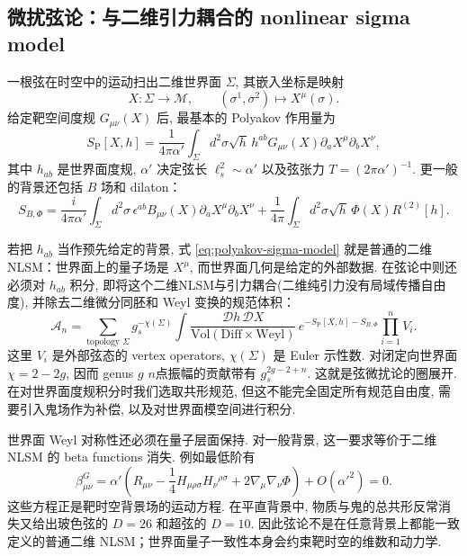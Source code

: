 \documentclass[10pt]{article}
\newcounter{ex}[section]\setcounter{ex}{0}
\numberwithin{equation}{section}
\begin{document}
\subsection{微扰弦论：与二维引力耦合的 nonlinear sigma model}

一根弦在时空中的运动扫出二维世界面 $\Sigma$, 其嵌入坐标是映射
\begin{equation}
X:\Sigma\longrightarrow\mathcal M,
\qquad
(\sigma^1,\sigma^2)\longmapsto X^\mu(\sigma).
\end{equation}
给定靶空间度规 $G_{\mu\nu}(X)$ 后, 最基本的 Polyakov 作用量为
\begin{equation}
S_{\mathrm P}[X,h]
=\frac{1}{4\pi\alpha'}
\int_\Sigma d^2\sigma\sqrt{h}\,
h^{ab}G_{\mu\nu}(X)
\partial_aX^\mu\partial_bX^\nu,
\label{eq:polyakov-sigma-model}
\end{equation}
其中 $h_{ab}$ 是世界面度规, $\alpha'$ 决定弦长 $\ell_s^2\sim\alpha'$ 以及弦张力 $T=(2\pi\alpha')^{-1}$. 更一般的背景还包括 $B$ 场和 dilaton：
\begin{equation}
S_{B,\Phi}
=\frac{i}{4\pi\alpha'}\int_\Sigma
d^2\sigma\,\epsilon^{ab}B_{\mu\nu}(X)
\partial_aX^\mu\partial_bX^\nu
+\frac{1}{4\pi}\int_\Sigma d^2\sigma\sqrt h\,
\Phi(X)R^{(2)}[h].
\end{equation}

若把 $h_{ab}$ 当作预先给定的背景, 式 \eqref{eq:polyakov-sigma-model} 就是普通的二维 NLSM：世界面上的量子场是 $X^\mu$, 而世界面几何是给定的外部数据. 在弦论中则还必须对 $h_{ab}$ 积分, 即将这个二维NLSM与引力耦合(二维纯引力没有局域传播自由度), 并除去二维微分同胚和 Weyl 变换的规范体积：
\begin{equation}
\mathcal A_n
=\sum_{\text{topology }\Sigma}
g_s^{-\chi(\Sigma)}
\int
\frac{\mathcal D h\,\mathcal D X}
{\mathrm{Vol}(\mathrm{Diff}\times\mathrm{Weyl})}
\,e^{-S_{\mathrm P}[X,h]-S_{B,\Phi}}
\prod_{i=1}^n V_i.
\label{eq:string-worldsheet-path-integral}
\end{equation}
这里 $V_i$ 是外部弦态的 vertex operators, $\chi(\Sigma)$ 是 Euler 示性数. 对闭定向世界面 $\chi=2-2g$, 因而 genus $g$ $n$点振幅的贡献带有 $g_s^{2g-2+n}$. 这就是弦微扰论的圈展开. 在对世界面度规积分时我们选取共形规范, 但这不能完全固定所有规范自由度, 需要引入鬼场作为补偿, 以及对世界面模空间进行积分. 

世界面 Weyl 对称性还必须在量子层面保持. 对一般背景, 这一要求等价于二维 NLSM 的 beta functions 消失. 例如最低阶有
\begin{equation}
\beta^G_{\mu\nu}
=\alpha'\left(
R_{\mu\nu}-\frac14H_{\mu\rho\sigma}H_\nu{}^{\rho\sigma}
+2\nabla_\mu\nabla_\nu\Phi
\right)+O(\alpha'^2)=0.
\end{equation}
这些方程正是靶时空背景场的运动方程. 在平直背景中, 物质与鬼的总共形反常消失又给出玻色弦的 $D=26$ 和超弦的 $D=10$. 因此弦论不是在任意背景上都能一致定义的普通二维 NLSM；世界面量子一致性本身会约束靶时空的维数和动力学.
\end{document}
